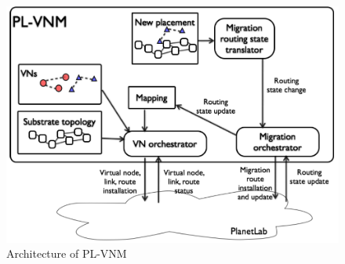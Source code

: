 \begin{figure}[ht]
    \centering
    \includegraphics[scale=0.5]{figures/pl-vnm.png}
    \caption{Architecture of PL-VNM~\cite{Lo2014}}
    \label{fig:plvnm}
\end{figure}

